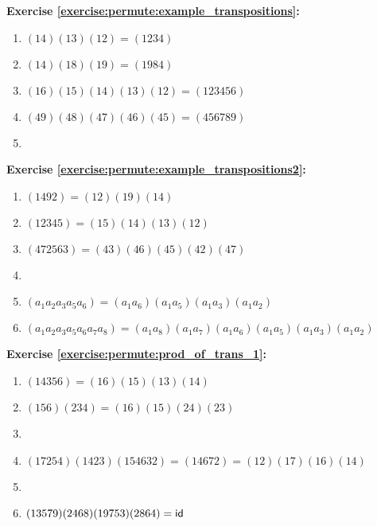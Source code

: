 \noindent\textbf{Exercise \ref{exercise:permute:example_transpositions}:}
\begin{enumerate}[{a.}]
\item
$(14)(13)(12) = (1234)$

\item
$(14)(18)(19) = (1984)$

\item
$(16)(15)(14)(13)(12) = (123456)$

\item
$(49)(48)(47)(46)(45) = (456789)$

\item

\end{enumerate}

\noindent\textbf{Exercise \ref{exercise:permute:example_transpositions2}:} %
\begin{enumerate}[{a.}]
\item
$(1492) = (12)(19)(14)$

\item
$(12345) = (15)(14)(13)(12)$

\item
$(472563) = (43)(46)(45)(42)(47)$

\item

\item
$(a_1a_2a_3a_5a_6) = (a_1a_6)(a_1a_5)(a_1a_3)(a_1a_2)$

\item
$(a_1 a_2 a_3 a_5 a_6 a_7 a_8) =  (a_1a_8)(a_1a_7)(a_1a_6)(a_1a_5)(a_1a_3)(a_1a_2)$
\end{enumerate}

\noindent\textbf{Exercise \ref{exercise:permute:prod_of_trans_1}:} %
\begin{enumerate}[{a.}]
\item
$(14356) = (16)(15)(13)(14)$

\item
$(156)(234) = (16)(15)(24)(23)$

\item

\item
$(17254)(1423)(154632) = (14672) = (12)(17)(16)(14)$

\item

\item
$( 1 3 5 7 9 )(2 4 6 8 ) (1 9 7 5 3) (2 8 6 4) = \sf{id}$
\end{enumerate}

